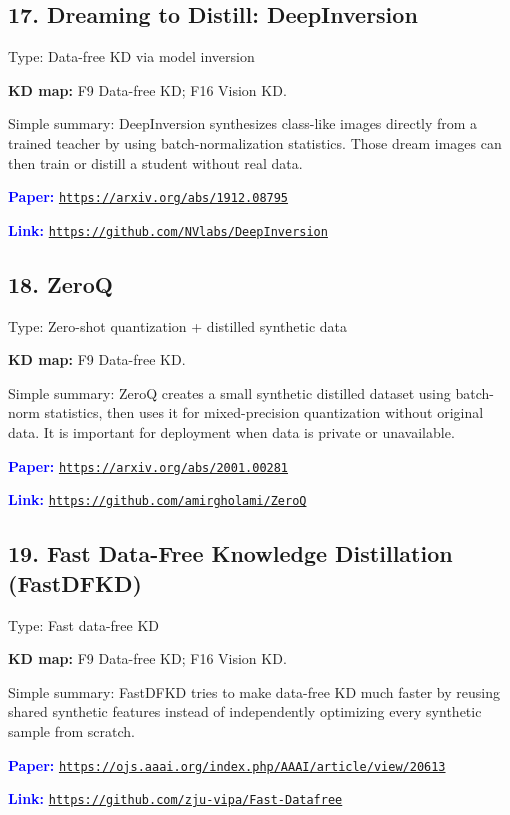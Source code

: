 \documentclass[10pt]{article}
\begin{document}
\subsection*{17. Dreaming to Distill: DeepInversion}
Type: Data-free KD via model inversion\par
\textbf{KD map:} F9 Data-free KD; F16 Vision KD.\par
Simple summary: DeepInversion synthesizes class-like images directly from a trained teacher by using batch-normalization statistics. Those dream images can then train or distill a student without real data.\par
\textcolor{blue}{\textbf{Paper:}} \href{https://arxiv.org/abs/1912.08795}{\nolinkurl{https://arxiv.org/abs/1912.08795}}\par
\textcolor{blue}{\textbf{Link:}} \href{https://github.com/NVlabs/DeepInversion}{\nolinkurl{https://github.com/NVlabs/DeepInversion}}\par

\subsection*{18. ZeroQ}
Type: Zero-shot quantization + distilled synthetic data\par
\textbf{KD map:} F9 Data-free KD.\par
Simple summary: ZeroQ creates a small synthetic distilled dataset using batch-norm statistics, then uses it for mixed-precision quantization without original data. It is important for deployment when data is private or unavailable.\par
\textcolor{blue}{\textbf{Paper:}} \href{https://arxiv.org/abs/2001.00281}{\nolinkurl{https://arxiv.org/abs/2001.00281}}\par
\textcolor{blue}{\textbf{Link:}} \href{https://github.com/amirgholami/ZeroQ}{\nolinkurl{https://github.com/amirgholami/ZeroQ}}\par

\subsection*{19. Fast Data-Free Knowledge Distillation (FastDFKD)}
Type: Fast data-free KD\par
\textbf{KD map:} F9 Data-free KD; F16 Vision KD.\par
Simple summary: FastDFKD tries to make data-free KD much faster by reusing shared synthetic features instead of independently optimizing every synthetic sample from scratch.\par
\textcolor{blue}{\textbf{Paper:}} \href{https://ojs.aaai.org/index.php/AAAI/article/view/20613}{\nolinkurl{https://ojs.aaai.org/index.php/AAAI/article/view/20613}}\par
\textcolor{blue}{\textbf{Link:}} \href{https://github.com/zju-vipa/Fast-Datafree}{\nolinkurl{https://github.com/zju-vipa/Fast-Datafree}}\par
\end{document}
